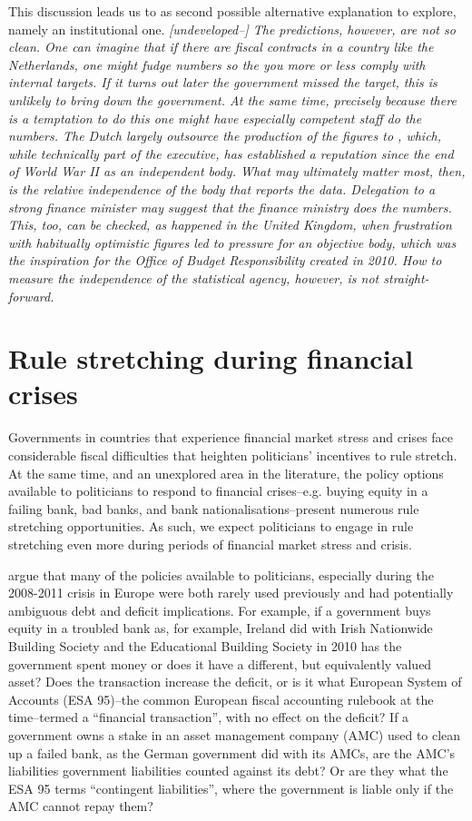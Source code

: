 \documentclass[]{article}
\begin{document}
This discussion leads us to as second possible alternative explanation to explore, namely an  institutional one. \emph{[undeveloped--]  The predictions, however, are not so clean. One can imagine that if there are fiscal contracts in a country like the Netherlands, one might fudge numbers so the you more or less comply with internal targets. If it turns out later the government missed the target, this is unlikely to bring down the government. At the same time, precisely because  there is a temptation to do this one might have especially competent staff do the numbers. The Dutch largely outsource the production of the figures to , which, while technically part of the executive, has established a reputation since the end of World War II as an independent body. What may ultimately matter most, then, is the relative independence of the body that reports the data. Delegation to a strong finance minister may suggest that the finance ministry does the numbers. This, too, can be checked, as happened in the United Kingdom, when frustration with habitually optimistic figures led to pressure for an objective body, which was the inspiration for the Office of Budget Responsibility created in 2010. How to measure the independence of the statistical agency, however, is not straight-forward.}

\section{Rule stretching during financial crises}

Governments in countries that experience financial market stress and crises face considerable fiscal difficulties \cite[see][]{Laeven2012} that heighten politicians' incentives to rule stretch. At the same time, and an unexplored area in the literature, the policy options available to politicians to respond to financial crises--e.g. buying equity in a failing bank, bad banks, and bank nationalisations--present numerous rule stretching opportunities. As such, we expect politicians to engage in rule stretching even more during periods of financial market stress and crisis.

\cite{GandrudHallerberg2016} argue that many of the policies available to politicians, especially during the 2008-2011 crisis in Europe were both rarely used previously and had potentially ambiguous debt and deficit implications. For example, if a government buys equity in a troubled bank as, for example, Ireland did with Irish Nationwide Building Society and the Educational Building Society in 2010 has the government spent money or does it have a different, but equivalently valued asset? Does the transaction increase the deficit, or is it what European System of Accounts (ESA 95)--the common European fiscal accounting rulebook at the time--termed a ``financial transaction'', with no effect on the deficit? If a government owns a stake in an asset management company (AMC) used to clean up a failed bank, as the German government did with its AMCs, are the AMC's liabilities government liabilities counted against its debt? Or are they what the ESA 95 terms ``contingent liabilities'', where the government is liable only if the AMC cannot repay them?
\end{document}
